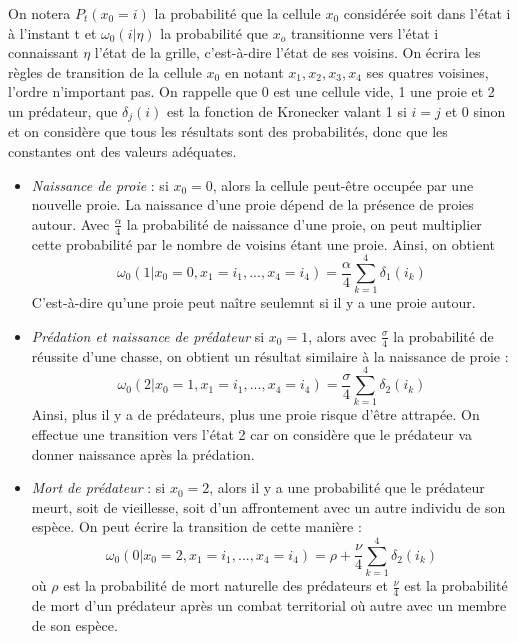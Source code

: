 On notera $ P_{t}(x_0=i)$ la probabilité que la cellule $x_0$ considérée soit dans l'état i à l'instant t et $\omega_0(i|\eta)$ la probabilité que $x_o$ transitionne vers l'état i connaissant $\eta$ l'état de la grille, c'est-à-dire l'état de ses voisins. On écrira les règles de transition de la cellule $x_0$ en notant $x_1, x_2, x_3, x_4$ ses quatres voisines, l'ordre n'important pas. On rappelle que 0 est une cellule vide, 1 une proie et 2 un prédateur, que $\delta_{j}(i)$ est la fonction de Kronecker valant 1 si $i=j$ et 0 sinon et on considère que tous les résultats sont des probabilités, donc que les constantes ont des valeurs adéquates.

\vspace{0.3cm}
\begin {itemize}
\item \textit{Naissance de proie} : si $x_0=0$, alors la cellule peut-être occupée par une nouvelle proie. La naissance d'une proie dépend de la présence de proies autour. Avec $\frac{\alpha}{4}$ la probabilité de naissance d'une proie, on peut multiplier cette probabilité par le nombre de voisins étant une proie. Ainsi, on obtient \begin{equation}\omega_0(1|x_0=0, x_1=i_1, ..., x_4=i_4)=\frac{\alpha}{4}\sum_{k=1}^{4}\delta_{1}(i_k)\end{equation} C'est-à-dire qu'une proie peut naître seulemnt si il y a une proie autour.

\vspace{0.3cm}
\item \textit{Prédation et naissance de prédateur} si $x_0=1$, alors avec $\frac{\sigma}{4}$ la probabilité de réussite d'une chasse, on obtient un résultat similaire à la naissance de proie :\begin{equation} \omega_0(2|x_0=1, x_1=i_1, ..., x_4=i_4)=\frac{\sigma}{4}\sum_{k=1}^{4}\delta_{2}(i_k)\end{equation} Ainsi, plus il y a de prédateurs, plus une proie risque d'être attrapée. On effectue une transition vers l'état 2 car on considère que le prédateur va donner naissance après la prédation.

\vspace{0.3cm}
\item \textit{Mort de prédateur} : si $x_0=2$, alors il y a une probabilité que le prédateur meurt, soit de vieillesse, soit d'un affrontement avec un autre individu de son espèce. On peut écrire la transition de cette manière : \begin{equation}\omega_0(0|x_0=2, x_1=i_1, ..., x_4=i_4)=\rho + \frac{\nu}{4}\sum_{k=1}^{4}\delta_{2}(i_k)\end{equation} où $\rho$ est la probabilité de mort naturelle des prédateurs et $\frac{\nu}{4}$ est la probabilité de mort d'un prédateur après un combat territorial où autre avec un membre de son espèce. 


\end{itemize}
